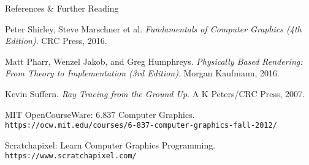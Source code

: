 \begin{frame}{References \& Further Reading}
    \footnotesize
    \begin{thebibliography}{9}
        Peter Shirley, Steve Marschner et al. 
        \textit{Fundamentals of Computer Graphics (4th Edition)}.
        CRC Press, 2016.
        
        Matt Pharr, Wenzel Jakob, and Greg Humphreys.
        \textit{Physically Based Rendering: From Theory to Implementation (3rd Edition)}.
        Morgan Kaufmann, 2016.
        
        Kevin Suffern.
        \textit{Ray Tracing from the Ground Up}.
        A K Peters/CRC Press, 2007.
        
        MIT OpenCourseWare: 6.837 Computer Graphics.
        \texttt{https://ocw.mit.edu/courses/6-837-computer-graphics-fall-2012/}
        
        Scratchapixel: Learn Computer Graphics Programming.
        \texttt{https://www.scratchapixel.com/}
    \end{thebibliography}
\end{frame}


